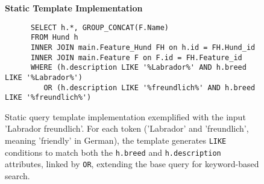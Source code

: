 \documentclass[../../submission.tex]{subfiles}
\begin{document}
\begin{figure}[h]
   \centering
   \textbf{Static Template Implementation}\par\medskip
   \begin{lstlisting}
      SELECT h.*, GROUP_CONCAT(F.Name) 
      FROM Hund h 
      INNER JOIN main.Feature_Hund FH on h.id = FH.Hund_id 
      INNER JOIN main.Feature F on F.id = FH.Feature_id
      WHERE (h.description LIKE '%Labrador%' AND h.breed LIKE '%Labrador%') 
         OR (h.description LIKE '%freundlich%' AND h.breed LIKE '%freundlich%')
   \end{lstlisting}
   \caption{Static query template implementation exemplified with the input 'Labrador freundlich'. For each token ('Labrador' and 'freundlich', meaning 'friendly' in German), the template generates \texttt{LIKE} conditions to match both the \texttt{h.breed} and \texttt{h.description} attributes, linked by \texttt{OR}, extending the base query for keyword-based search.}
   \label{fig:static_template}
\end{figure}
\end{document}
